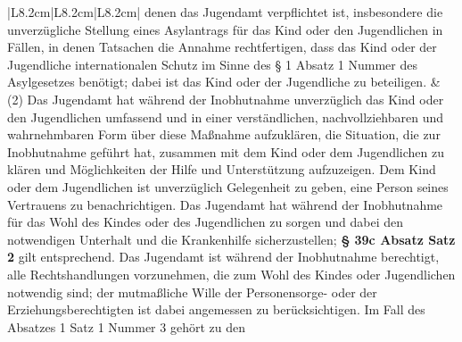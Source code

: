 \documentclass[10pt,a4paper,landscape]{article}
\begin{document}
\begin{longtable}{|L{8.2cm}|L{8.2cm}|L{8.2cm}|}
\newline denen das Jugendamt verpflichtet ist,  \newline insbesondere die unverzügliche Stellung  \newline eines Asylantrags für das Kind oder den  \newline Jugendlichen in Fällen, in denen Tatsachen  \newline die Annahme rechtfertigen, dass das Kind  \newline oder der Jugendliche internationalen  \newline Schutz im Sinne des \S{} 1 Absatz 1 Nummer   des Asylgesetzes benötigt; dabei ist das  \newline Kind oder der Jugendliche zu beteiligen. & (2) Das Jugendamt hat während der  \newline Inobhutnahme unverzüglich das Kind oder  \newline den Jugendlichen umfassend und in einer  \newline verständlichen, nachvollziehbaren und  \newline wahrnehmbaren Form über diese  \newline Maßnahme aufzuklären, die Situation, die  \newline zur Inobhutnahme geführt hat, zusammen  \newline mit dem Kind oder dem Jugendlichen zu  \newline klären und Möglichkeiten der Hilfe und  \newline Unterstützung aufzuzeigen. Dem Kind oder  \newline dem Jugendlichen ist unverzüglich  \newline Gelegenheit zu geben, eine Person seines  \newline Vertrauens zu benachrichtigen. Das  \newline Jugendamt hat während der Inobhutnahme  \newline für das Wohl des Kindes oder des  \newline Jugendlichen zu sorgen und dabei den  \newline notwendigen Unterhalt und die  \newline Krankenhilfe sicherzustellen; \textbf{\S{} 39c Absatz   Satz 2} gilt entsprechend. Das Jugendamt  \newline ist während der Inobhutnahme berechtigt,  \newline alle Rechtshandlungen vorzunehmen, die  \newline zum Wohl des Kindes oder Jugendlichen  \newline notwendig sind; der mutmaßliche Wille der  \newline Personensorge- oder der  \newline Erziehungsberechtigten ist dabei  \newline angemessen zu berücksichtigen. Im Fall  \newline des Absatzes 1 Satz 1 Nummer 3 gehört  \newline zu den 
\end{longtable}
\end{document}
